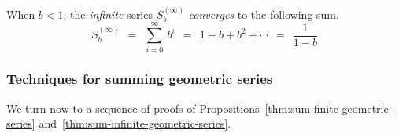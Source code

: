\begin{prop}
\label{thm:sum-infinite-geometric-series}
When $b < 1$,  the {\em infinite} series $S^{(\infty)}_{b}$ {\em
  converges} to the following sum.
\[ S^{(\infty)}_{b} \ \ = \ \
\sum_{i=0}^\infty \ b^i \ \ = \ \ 1 + b + b^2 + \cdots
 \ \ = \ \ \frac{1}{1-b}
\]
\end{prop}

\subsubsection{Techniques for summing geometric series}
\label{sec:summing-geometric-series:techniques}

We turn now to a sequence of proofs of Propositions~\ref{thm:sum-finite-geometric-series} and~\ref{thm:sum-infinite-geometric-series}.

\medskip

